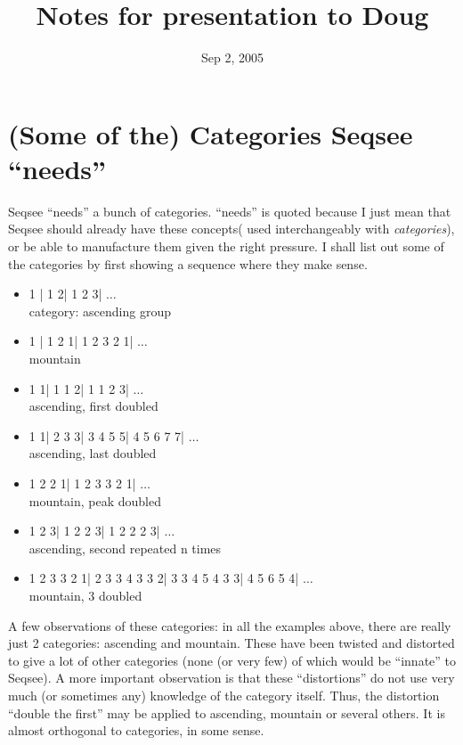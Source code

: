 \documentclass{article}
\begin{document}
\title{Notes for presentation to Doug}
\date{Sep 2, 2005}
\maketitle

\section{(Some of the) Categories Seqsee ``needs''}

Seqsee ``needs'' a bunch of categories. ``needs'' is quoted because I just mean that Seqsee should already have these concepts( used interchangeably with \textit{categories}), or be able to manufacture them given the right pressure. I shall list out some of the categories by first showing a sequence where they make sense.

\begin{itemize}
\item 1 | 1 2| 1 2 3| $\ldots$ \\ category: ascending group
\item 1 | 1 2 1| 1 2 3 2 1| $\ldots$ \\ mountain
\item 1 1| 1 1 2| 1 1 2 3| $\ldots$ \\ ascending, first doubled
\item 1 1| 2 3 3| 3 4 5 5| 4 5 6 7 7| $\ldots$\\ ascending, last doubled 
\item 1 2 2 1| 1 2 3 3 2 1| $\ldots$\\ mountain, peak doubled 
\item 1 2 3| 1 2 2 3| 1 2 2 2 3| $\ldots$\\ ascending, second repeated n times  
\item 1 2 3 3 2 1| 2 3 3 4 3 3 2| 3 3 4 5 4 3 3| 4 5 6 5 4| $\ldots$\\ mountain, 3 doubled  
\end{itemize}

A few observations of these categories: in all the examples above, there are really just 2 categories: ascending and mountain. These have been twisted and distorted to give a lot of other categories (none (or very few) of which would be ``innate'' to Seqsee). A more important observation is that these ``distortions'' do not use very much (or sometimes any) knowledge of the category itself. Thus, the distortion ``double the first'' may be applied to ascending, mountain or several others. It is almost orthogonal to categories, in some sense.
\end{document}
